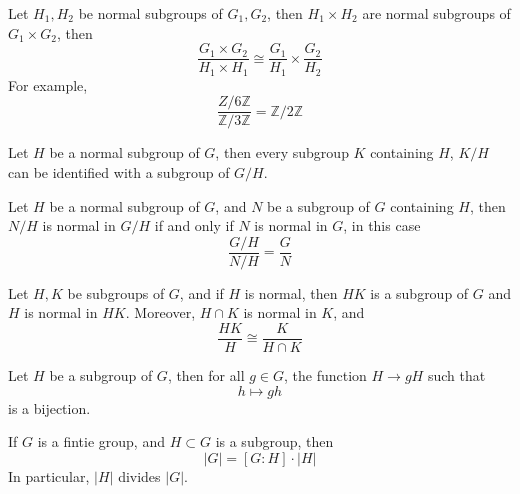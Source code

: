 \documentclass[openany]{book}
\newcommand{\Z}{\mathbb{Z}}
\begin{document}
\begin{prop}
    Let $H_1,H_2$ be normal subgroups of $G_1,G_2$, then $H_1\times H_2$ are normal subgroups of $G_1\times G_2$, then 
    \begin{equation*}
        \frac{G_1\times G_2}{H_1\times H_1}\cong\frac{G_1}{H_1}\times\frac{G_2}{H_2}
    \end{equation*}
    For example, 
    \begin{equation*}
        \frac{Z/6\Z}{\Z/3\Z}=\Z/2\Z
    \end{equation*}
\end{prop}

\begin{prop}
    Let $H$ be a normal subgroup of $G$, then every subgroup $K$ containing $H$, $K/H$ can be identified with a subgroup of $G/H$.
\end{prop}


\begin{prop}
    Let $H$ be a normal subgroup of $G$, and $N$ be a subgroup of $G$ containing $H$, then $N/H$ is normal in $G/H$ if and only if $N$ is normal in $G$, in this case
    \begin{equation*}
        \frac{G/H}{N/H}=\frac{G}{N}
    \end{equation*}
\end{prop}



\begin{prop}
    Let $H,K$ be subgroups of $G$, and if $H$ is normal, then $HK$ is a subgroup of $G$ and $H$ is normal in $HK$. Moreover, $H\cap K$ is normal in $K$, and 
    \begin{equation*}
        \frac{HK}{H}\cong\frac{K}{H\cap K}
    \end{equation*}
\end{prop}


\begin{prop}
    Let $H$ be a subgroup of $G$, then for all $g\in G$, the function $H\to gH$ such that
    \begin{equation*}
       h\mapsto gh
    \end{equation*}
    is a bijection.
\end{prop}

\begin{thm}[Lagrange]
    If $G$ is a fintie group, and $H\subset G$ is a subgroup, then 
    \begin{equation*}
        |G|=[G:H]\cdot|H|
    \end{equation*}
    In particular, $|H|$ divides $|G|$.
\end{thm}
\end{document}
